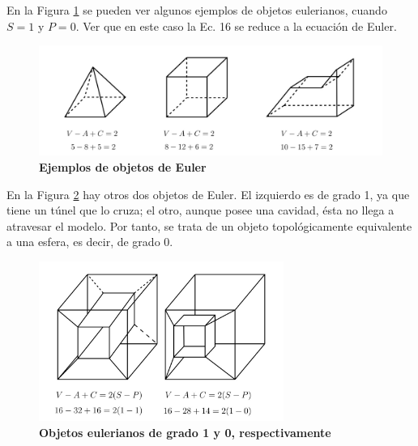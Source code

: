 En la Figura \ref{fig:euler1} se pueden ver algunos ejemplos de objetos eulerianos, cuando $S = 1$ y $P = 0$. Ver que en este caso la Ec. 16 se reduce a la ecuación de Euler.

\begin{figure}[h]
\includegraphics[width=14cm]{Img/GEO/geo-euler1.jpg}
\centering
\caption{\textbf{{Ejemplos de objetos de Euler}}}
\label{fig:euler1}
\end{figure}


En la Figura \ref{fig:euler2} hay otros dos objetos de Euler. El izquierdo es de grado 1, ya que tiene un túnel que lo cruza; el otro, aunque posee una cavidad, ésta no llega a atravesar el modelo. Por tanto, se trata de un objeto topológicamente equivalente a una esfera, es decir, de grado 0.

\begin{figure}[h]
\includegraphics[width=8cm]{Img/GEO/geo-euler2.jpg}
\centering
\caption{\textbf{\footnotesize{Objetos eulerianos de grado 1 y 0, respectivamente}}}
\label{fig:euler2}
\end{figure}


